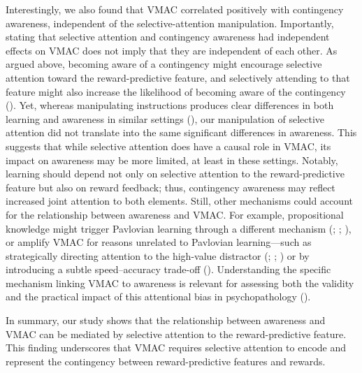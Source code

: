 \documentclass[
  man,
  floatsintext,
  longtable,
  nolmodern,
  notxfonts,
  notimes,
  mask,
  colorlinks=true,linkcolor=blue,citecolor=blue,urlcolor=blue]{apa7}
\begin{document}
Interestingly, we also found that VMAC correlated positively with
contingency awareness, independent of the selective-attention
manipulation. Importantly, stating that selective attention and
contingency awareness had independent effects on VMAC does not imply
that they are independent of each other. As argued above, becoming aware
of a contingency might encourage selective attention toward the
reward-predictive feature, and selectively attending to that feature
might also increase the likelihood of becoming aware of the contingency
(). Yet, whereas manipulating
instructions produces clear differences in both learning and awareness
in similar settings (), our manipulation of selective attention did
not translate into the same significant differences in awareness. This
suggests that while selective attention does have a causal role in VMAC,
its impact on awareness may be more limited, at least in these settings.
Notably, learning should depend not only on selective attention to the
reward-predictive feature but also on reward feedback; thus, contingency
awareness may reflect increased joint attention to both elements. Still,
other mechanisms could account for the relationship between awareness
and VMAC. For example, propositional knowledge might trigger Pavlovian
learning through a different mechanism (; ;
), or amplify VMAC for
reasons unrelated to Pavlovian learning---such as strategically
directing attention to the high-value distractor
(;
;
) or by introducing a
subtle speed--accuracy trade-off
().
Understanding the specific mechanism linking VMAC to awareness is
relevant for assessing both the validity and the practical impact of
this attentional bias in psychopathology
().

In summary, our study shows that the relationship between awareness and
VMAC can be mediated by selective attention to the reward-predictive
feature. This finding underscores that VMAC requires selective attention
to encode and represent the contingency between reward-predictive
features and rewards.
\end{document}
